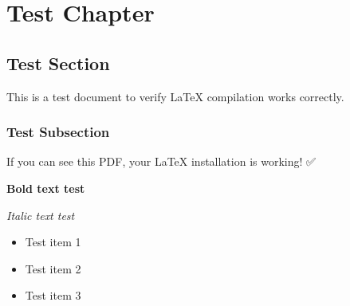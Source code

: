 \documentclass[12pt]{report}
\begin{document}
\chapter{Test Chapter}

\section{Test Section}

This is a test document to verify LaTeX compilation works correctly.

\subsection{Test Subsection}

If you can see this PDF, your LaTeX installation is working! ✅

\textbf{Bold text test}

\textit{Italic text test}

\begin{itemize}
    \item Test item 1
    \item Test item 2
    \item Test item 3
\end{itemize}
\end{document}
